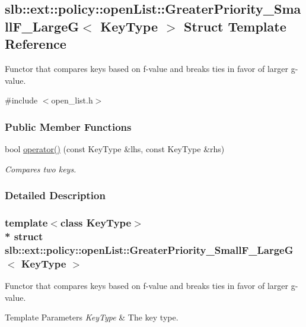 \hypertarget{structslb_1_1ext_1_1policy_1_1openList_1_1GreaterPriority__SmallF__LargeG}{}\subsection{slb\+:\+:ext\+:\+:policy\+:\+:open\+List\+:\+:Greater\+Priority\+\_\+\+Small\+F\+\_\+\+LargeG$<$ Key\+Type $>$ Struct Template Reference}
\label{structslb_1_1ext_1_1policy_1_1openList_1_1GreaterPriority__SmallF__LargeG}


Functor that compares keys based on f-\/value and breaks ties in favor of larger g-\/value.  




{\ttfamily \#include $<$open\+\_\+list.\+h$>$}

\subsubsection*{Public Member Functions}
\begin{DoxyCompactItemize}
\item 
bool \hyperlink{structslb_1_1ext_1_1policy_1_1openList_1_1GreaterPriority__SmallF__LargeG_ae6322cd3c71786a3d1299991e7a3d175}{operator()} (const Key\+Type \&lhs, const Key\+Type \&rhs)
\begin{DoxyCompactList}\small\item\em Compares two keys. \end{DoxyCompactList}\end{DoxyCompactItemize}


\subsubsection{Detailed Description}
\subsubsection*{template$<$class Key\+Type$>$\\*
struct slb\+::ext\+::policy\+::open\+List\+::\+Greater\+Priority\+\_\+\+Small\+F\+\_\+\+Large\+G$<$ Key\+Type $>$}

Functor that compares keys based on f-\/value and breaks ties in favor of larger g-\/value. 


\begin{DoxyTemplParams}{Template Parameters}
{\em Key\+Type} & The key type. \\
\hline
\end{DoxyTemplParams}

